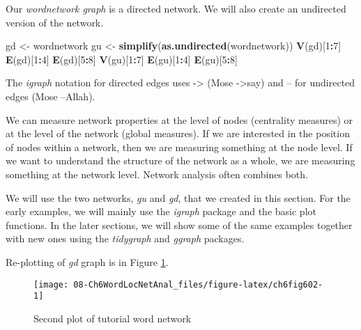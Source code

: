 \documentclass[
]{article}
\newenvironment{Shaded}{\begin{snugshade}}{\end{snugshade}}
\newcommand{\DecValTok}[1]{\textcolor[rgb]{0.00,0.00,0.81}{#1}}
\newcommand{\FunctionTok}[1]{\textcolor[rgb]{0.13,0.29,0.53}{\textbf{#1}}}
\newcommand{\NormalTok}[1]{#1}
\newcommand{\OtherTok}[1]{\textcolor[rgb]{0.56,0.35,0.01}{#1}}
\newcommand{\SpecialCharTok}[1]{\textcolor[rgb]{0.81,0.36,0.00}{\textbf{#1}}}
\begin{document}
Our \emph{wordnetwork graph} is a directed network. We will also create an undirected version of the network.

\scriptsize

\begin{Shaded}
\begin{Highlighting}[]
\NormalTok{gd }\OtherTok{\textless{}{-}}\NormalTok{ wordnetwork}
\NormalTok{gu }\OtherTok{\textless{}{-}} \FunctionTok{simplify}\NormalTok{(}\FunctionTok{as.undirected}\NormalTok{(wordnetwork))}
\FunctionTok{V}\NormalTok{(gd)[}\DecValTok{1}\SpecialCharTok{:}\DecValTok{7}\NormalTok{]}
\FunctionTok{E}\NormalTok{(gd)[}\DecValTok{1}\SpecialCharTok{:}\DecValTok{4}\NormalTok{]}
\FunctionTok{E}\NormalTok{(gd)[}\DecValTok{5}\SpecialCharTok{:}\DecValTok{8}\NormalTok{]}
\FunctionTok{V}\NormalTok{(gu)[}\DecValTok{1}\SpecialCharTok{:}\DecValTok{7}\NormalTok{]}
\FunctionTok{E}\NormalTok{(gu)[}\DecValTok{1}\SpecialCharTok{:}\DecValTok{4}\NormalTok{]}
\FunctionTok{E}\NormalTok{(gu)[}\DecValTok{5}\SpecialCharTok{:}\DecValTok{8}\NormalTok{]}
\end{Highlighting}
\end{Shaded}

\normalsize

The \emph{igraph} notation for directed edges uses -\textgreater{} (Mose -\textgreater say) and -- for undirected edges (Mose --Allah).

We can measure network properties at the level of nodes (centrality measures) or at the level of the network (global measures). If we are interested in the position of nodes within a network, then we are measuring something at the node level. If we want to understand the structure of the network as a whole, we are measuring something at the network level. Network analysis often combines both.

We will use the two networks, \emph{gu} and \emph{gd}, that we created in this section. For the early examples, we will mainly use the \emph{igraph} package and the basic plot functions. In the later sections, we will show some of the same examples together with new ones using the \emph{tidygraph} and \emph{ggraph} packages.

Re-plotting of \emph{gd} graph is in Figure \ref{fig:ch6fig602}.

\begin{figure}

{\centering \texttt{[image: 08-Ch6WordLocNetAnal\_files/figure-latex/ch6fig602-1]} 

}

\caption{Second plot of tutorial word network}\label{fig:ch6fig602}
\end{figure}
\end{document}
